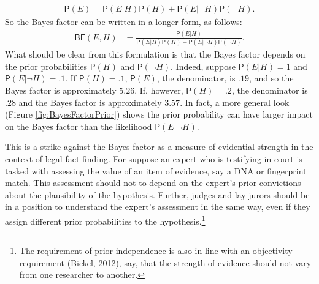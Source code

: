 \documentclass[
  10pt,
  dvipsnames,enabledeprecatedfontcommands]{scrartcl}
\newcommand{\n}{\neg}
\newcommand{\pr}[1]{\mathsf{P}(#1)}
\begin{document}
\begin{align} \label{eq:lotpSimple}
\pr{E}= \pr{E \vert H} \pr{H}+\pr{E \vert \neg H} \pr{\neg H}.
\end{align} \noindent  So the Bayes factor can be written in a longer
form, as follows: \begin{align}\label{eq:BFlotp}
\mathsf{BF}(E,H) & = \frac{\pr{E \vert H}}{\pr{E \vert H} \pr{H}+\pr{E \vert \neg H} \pr{\neg H}}.
\end{align} \noindent What should be clear from this formulation is that
the Bayes factor depends on the prior probabilities \(\pr{H}\) and
\(\pr{\neg H}\). Indeed, suppose \(\pr{E \vert H} = 1\) and
\(\pr{E \vert \neg H} = .1\). If \(\pr{H}=.1\), \(\pr{E}\), the
denominator, is \(.19\), and so the Bayes factor is approximately
\(5.26\). If, however, \(\pr{H} =.2\), the denominator is \(.28\) and
the Bayes factor is approximately \(3.57\). In fact, a more general look
(Figure \ref{fig:BayesFactorPrior}) shows the prior probability can have
larger impact on the Bayes factor than the likelihood
\(\pr{E \vert \n H}\).

This is a strike against the Bayes factor as a measure of evidential
strength in the context of legal fact-finding. For suppose an expert who
is testifying in court is tasked with assessing the value of an item of
evidence, say a DNA or fingerprint match. This assessment should not to
depend on the expert's prior convictions about the plausibility of the
hypothesis. Further, judges and lay jurors should be in a position to
understand the expert's assessment in the same way, even if they assign
different prior probabilities to the hypothesis.\footnote{The
  requirement of prior independence is also in line with an objectivity
  requirement (Bickel, 2012), say, that the strength of evidence should
  not vary from one researcher to another.}

\footnotesize

\normalsize
\end{document}
